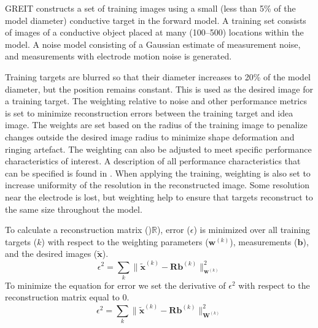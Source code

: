 GREIT constructs a set of training images using a small (less than 5\% of the model diameter) 
conductive target in the 
forward model. A training set consists of images of a conductive object
placed at many (100--500) locations within the model. 
A noise model consisting of a Gaussian estimate of measurement noise, 
and measurements with electrode motion noise is generated. 

Training targets are blurred so that their diameter increases to 20\% of 
the model diameter, but the position remains constant. 
This is used as the desired image for a training target. 
The weighting relative to noise and other performance metrics 
is set to minimize reconstruction errors between the training target and idea image. 
The weights are set based on the radius of the training image to penalize
changes outside the desired image radius to minimize shape deformation
and ringing artefact. The weighting can also be adjusted to meet specific performance 
characteristics of interest. A description of all performance characteristics that 
can be specified is found in \parencite{adler_greit_2009}.
When applying the training, weighting is also set to increase uniformity 
of the resolution in the reconstructed image. Some resolution near the electrode is 
lost, but weighting help to ensure that targets reconstruct to the same size throughout the model.

To calculate a reconstruction matrix ()$\mathbb{R}$), error ($\epsilon$)
is minimized over all training targets ($k$) with respect to the 
weighting parameters ($\mathbf{w}^{(k)}$),
measurements ($\mathbf{b}$), and the desired images ($\mathbf{\tilde{x}}$).
\begin{equation} \label{eq:greit_min}
	\epsilon^2 = \sum_{k} \|\mathbf{\tilde{x}}^{(k)}
    - \mathbf{Rb}^{(k)}\|^{2}_{\mathbf{w}^{(k)}}
\end{equation}
To minimize the equation for error we set the derivative of $\epsilon^2$ with respect to the reconstruction 
matrix equal to 0.
\begin{equation} 
	\epsilon^2 = \sum_{k} \|\mathbf{\tilde{x}}^{(k)}
    - \mathbf{Rb}^{(k)}\|^{2}_{\mathbf{W}^{(k)}}
\end{equation}

